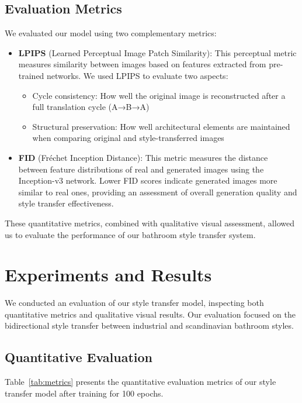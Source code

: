 \documentclass[twocolumn,superscriptaddress,aps]{revtex4-1}
\begin{document}
\subsection{Evaluation Metrics}

We evaluated our model using two complementary metrics:

\begin{itemize}
    \item \textbf{LPIPS} (Learned Perceptual Image Patch Similarity): This perceptual metric measures similarity between images based on features extracted from pre-trained networks. We used LPIPS to evaluate two aspects:
    \begin{itemize}
        \item Cycle consistency: How well the original image is reconstructed after a full translation cycle (A→B→A)
        \item Structural preservation: How well architectural elements are maintained when comparing original and style-transferred images
    \end{itemize}
    
    \item \textbf{FID} (Fréchet Inception Distance): This metric measures the distance between feature distributions of real and generated images using the Inception-v3 network. Lower FID scores indicate generated images more similar to real ones, providing an assessment of overall generation quality and style transfer effectiveness.
\end{itemize}

These quantitative metrics, combined with qualitative visual assessment, allowed us to evaluate the performance of our bathroom style transfer system.

\section{Experiments and Results}

We conducted an evaluation of our style transfer model, inspecting both quantitative metrics and qualitative visual results. Our evaluation focused on the bidirectional style transfer between industrial and scandinavian bathroom styles.

\subsection{Quantitative Evaluation}

Table~\ref{tab:metrics} presents the quantitative evaluation metrics of our style transfer model after training for 100 epochs.
\end{document}
